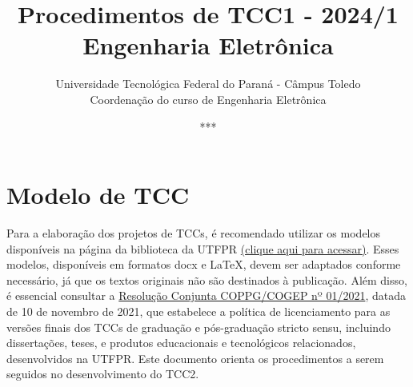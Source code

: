 \documentclass[a4paper, 12pt]{article}
\title{Procedimentos de TCC1 - 2024/1\\\textbf{Engenharia Eletrônica}}
\date{***}
\author{Universidade Tecnológica Federal do Paraná - Câmpus Toledo\\Coordenação do curso de Engenharia Eletrônica}
\begin{document}
    \maketitle
    
    \section{Modelo de TCC}

	Para a elaboração dos projetos de TCCs, é recomendado utilizar os modelos disponíveis na página da biblioteca da UTFPR \href{http://portal.utfpr.edu.br/biblioteca/trabalhos-academicos}{(clique aqui para acessar)}. Esses modelos, disponíveis em formatos docx e \LaTeX, devem ser adaptados conforme necessário, já que os textos originais não são destinados à publicação. Além disso, é essencial consultar a \href{https://sei.utfpr.edu.br/sei/publicacoes/controlador_publicacoes.php?acao=publicacao_visualizar&id_documento=2615190&id_orgao_publicacao=0}{Resolução Conjunta COPPG/COGEP nº 01/2021}, datada de 10 de novembro de 2021, que estabelece a política de licenciamento para as versões finais dos TCCs de graduação e pós-graduação stricto sensu, incluindo dissertações, teses, e produtos educacionais e tecnológicos relacionados, desenvolvidos na UTFPR. Este documento orienta os procedimentos a serem seguidos no desenvolvimento do TCC2.

    
\end{document}
